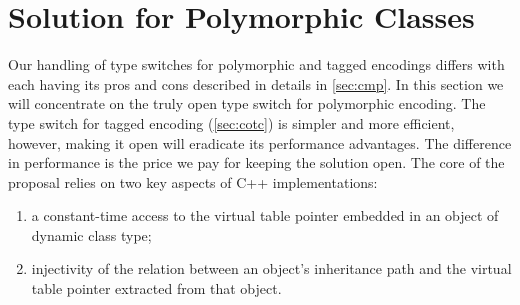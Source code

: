 \documentclass[preprint]{sigplanconf}
\makeatletter
\DeclareRobustCommand{\code}[1]{{\lstinline[breaklines=false,escapechar=@]{#1}}}
\makeatother
\begin{document}

%

%

\section{Solution for Polymorphic Classes}
\label{sec:copc}

Our handling of type switches for polymorphic and tagged encodings differs 
with each having its pros and cons described in details in \textsection\ref{sec:cmp}.
In this section we will concentrate on the truly open type switch for 
polymorphic encoding. The type switch for tagged encoding (\textsection\ref{sec:cotc}) 
is simpler and more efficient, however, making it open will eradicate its 
performance advantages. The difference in performance is the price we pay for 
keeping the solution open.  The core of the proposal relies on two key
aspects of C++ implementations:
\begin{enumerate}
\item a constant-time access to the virtual table pointer embedded in an object of
  dynamic class type;
\item injectivity of the relation between an object's inheritance path
  and the virtual table pointer extracted from that object.
\end{enumerate}
\end{document}
